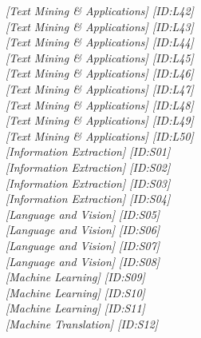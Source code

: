 \hfill \textit{[Text Mining \& Applications]  [ID:L42]} \\ 
\hfill \textit{[Text Mining \& Applications]  [ID:L43]} \\ 
\hfill \textit{[Text Mining \& Applications]  [ID:L44]} \\ 
\hfill \textit{[Text Mining \& Applications]  [ID:L45]} \\ 
\hfill \textit{[Text Mining \& Applications]  [ID:L46]} \\ 
\hfill \textit{[Text Mining \& Applications]  [ID:L47]} \\ 
\hfill \textit{[Text Mining \& Applications]  [ID:L48]} \\ 
\hfill \textit{[Text Mining \& Applications]  [ID:L49]} \\ 
\hfill \textit{[Text Mining \& Applications]  [ID:L50]} \\ 
\hfill \textit{[Information Extraction]  [ID:S01]} \\ 
\hfill \textit{[Information Extraction]  [ID:S02]} \\ 
\hfill \textit{[Information Extraction]  [ID:S03]} \\ 
\hfill \textit{[Information Extraction]  [ID:S04]} \\ 
\hfill \textit{[Language and Vision]  [ID:S05]} \\ 
\hfill \textit{[Language and Vision]  [ID:S06]} \\ 
\hfill \textit{[Language and Vision]  [ID:S07]} \\ 
\hfill \textit{[Language and Vision]  [ID:S08]} \\ 
\hfill \textit{[Machine Learning]  [ID:S09]} \\ 
\hfill \textit{[Machine Learning]  [ID:S10]} \\ 
\hfill \textit{[Machine Learning]  [ID:S11]} \\ 
\hfill \textit{[Machine Translation]  [ID:S12]} \\ 
